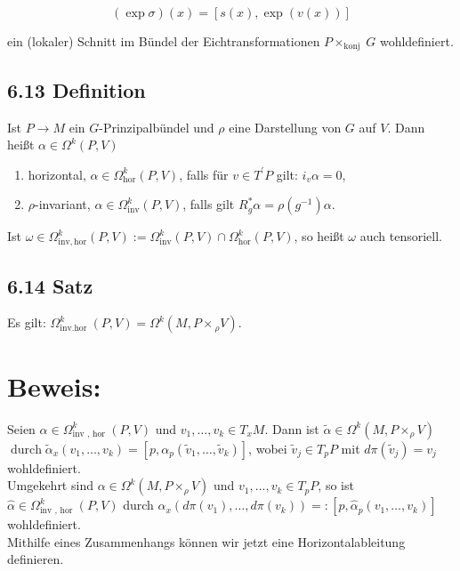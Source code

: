 \documentclass[10pt, letterpaper]{article}
\begin{document}
$$
(\exp \sigma)(x)=[s(x), \exp (v(x))]
$$

ein (lokaler) Schnitt im Bündel der Eichtransformationen $P \times_{\text {konj }} G$ wohldefiniert.

\subsection*{6.13 Definition}
Ist $P \rightarrow M$ ein $G$-Prinzipalbündel und $\rho$ eine Darstellung von $G$ auf $V$. Dann heißt $\alpha \in \Omega^{k}(P, V)$

\begin{enumerate}
  \item horizontal, $\alpha \in \Omega_{\mathrm{hor}}^{k}(P, V)$, falls für $v \in T^{\prime} P$ gilt: $i_{v} \alpha=0$,
  \item $\rho$-invariant, $\alpha \in \Omega_{\mathrm{inv}}^{k}(P, V)$, falls gilt $R_{g}^{*} \alpha=\rho\left(g^{-1}\right) \alpha$.
\end{enumerate}

Ist $\omega \in \Omega_{\mathrm{inv}, \mathrm{hor}}^{k}(P, V):=\Omega_{\mathrm{inv}}^{k}(P, V) \cap \Omega_{\mathrm{hor}}^{k}(P, V)$, so heißt $\omega$ auch tensoriell.

\subsection*{6.14 Satz}
Es gilt: $\Omega_{\text {inv.hor }}^{k}(P, V)=\Omega^{k}\left(M, P \times{ }_{\rho} V\right)$.

\section*{Beweis:}
Seien $\alpha \in \Omega_{\text {inv }, \text { hor }}^{k}(P, V)$ und $v_{1}, \ldots, v_{k} \in T_{x} M$. Dann ist $\tilde{\alpha} \in \Omega^{k}\left(M, P \times_{\rho} V\right)$ $\operatorname{durch} \tilde{\alpha}_{x}\left(v_{1}, \ldots, v_{k}\right)=\left[p, \alpha_{p}\left(\tilde{v}_{1}, \ldots, \tilde{v}_{k}\right)\right]$, wobei $\tilde{v}_{j} \in T_{p} P$ mit $d \pi\left(\tilde{v}_{j}\right)=v_{j}$ wohldefiniert.\\
Umgekehrt sind $\alpha \in \Omega^{k}\left(M, P \times_{\rho} V\right)$ und $v_{1}, \ldots, v_{k} \in T_{p} P$, so ist $\hat{\alpha} \in \Omega_{\text {inv }, \text { hor }}^{k}(P, V)$ durch $\alpha_{x}\left(d \pi\left(v_{1}\right), \ldots, d \pi\left(v_{k}\right)\right)=:\left[p, \hat{\alpha}_{p}\left(v_{1}, \ldots, v_{k}\right)\right]$ wohldefiniert.\\
Mithilfe eines Zusammenhangs können wir jetzt eine Horizontalableitung definieren.
\end{document}
